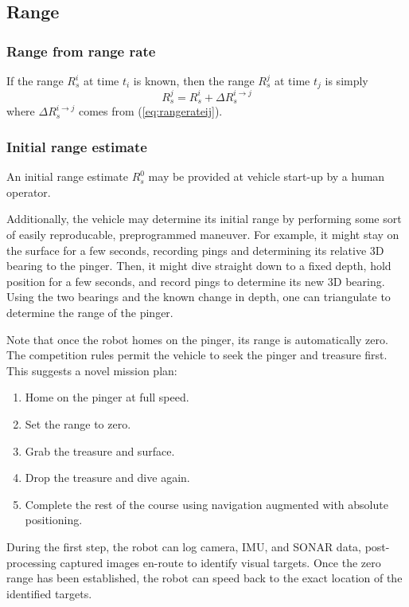 \documentclass[10pt]{article}
\begin{document}
\subsection{Range}

\subsubsection{Range from range rate}

If the range \(R_s^i\) at time \(t_i\) is known, then the range \(R_s^j\) at time \(t_j\) is simply
\begin{equation}
R_s^j = R_s^i + \Delta R_s^{i\rightarrow j}
\end{equation}
where \(\Delta R_s^{i\rightarrow j}\) comes from (\ref{eq:rangerateij}).

\subsubsection{Initial range estimate}

An initial range estimate \(R_s^0\) may be provided at vehicle start-up by a human operator.

Additionally, the vehicle may determine its initial range by performing some sort of easily reproducable, preprogrammed maneuver.  For example, it might stay on the surface for a few seconds, recording pings and determining its relative 3D bearing to the pinger.  Then, it might dive straight down to a fixed depth, hold position for a few seconds, and record pings to determine its new 3D bearing.  Using the two bearings and the known change in depth, one can triangulate to determine the range of the pinger.

Note that once the robot homes on the pinger, its range is automatically zero.  The competition rules permit the vehicle to seek the pinger and treasure first.  This suggests a novel mission plan:

\begin{enumerate}
\item Home on the pinger at full speed.
\item Set the range to zero.
\item Grab the treasure and surface.
\item Drop the treasure and dive again.
\item Complete the rest of the course using navigation augmented with absolute positioning.
\end{enumerate}

During the first step, the robot can log camera, IMU, and SONAR data, post-processing captured images en-route to identify visual targets.  Once the zero range has been established, the robot can speed back to the exact location of the identified targets.
\end{document}
